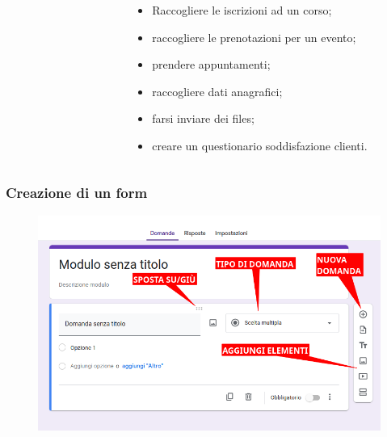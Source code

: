 \documentclass[handout]{beamer}
\begin{document}
\begin{frame}
\begin{columns}
\begin{column}{.4\textwidth}
\begin{figure}
    \end{figure}
  \end{column}
  \begin{column}{.6\textwidth}
\begin{itemize}
  \item Raccogliere le iscrizioni ad un corso;\pause
  \item raccogliere le prenotazioni per un evento;\pause
  \item prendere appuntamenti;\pause
  \item raccogliere dati anagrafici;\pause
  \item farsi inviare dei files;\pause
  \item creare un questionario soddisfazione clienti.
\end{itemize}
  \end{column}
\end{columns}
\end{frame}




\begin{frame}
\frametitle{Creazione di un form}
\begin{figure}
  \includegraphics[width=\columnwidth]{img/form2.png}
\end{figure}
\end{frame}
\end{document}
